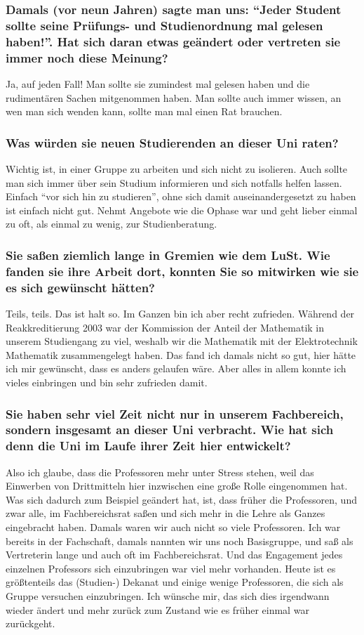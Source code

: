 {    \subsubsection*{Damals (vor neun Jahren) sagte man uns: "`Jeder Student sollte seine Prüfungs- und Studienordnung mal gelesen haben!"'. Hat sich daran etwas geändert oder vertreten sie immer noch diese Meinung?}
    Ja, auf jeden Fall! Man sollte sie zumindest mal gelesen haben und die rudimentären Sachen mitgenommen haben. Man sollte auch immer wissen, an wen man sich wenden kann, sollte man mal einen Rat brauchen.
    \subsubsection*{Was würden sie neuen Studierenden an dieser Uni raten?}
    Wichtig ist, in einer Gruppe zu arbeiten und sich nicht zu isolieren. Auch sollte man sich immer über sein Studium informieren und sich notfalls helfen lassen. Einfach "`vor sich hin zu studieren"', ohne sich damit auseinandergesetzt zu haben ist einfach nicht gut. Nehmt Angebote wie die Ophase war und geht lieber einmal zu oft, als einmal zu wenig, zur Studienberatung.
    \subsubsection*{Sie saßen ziemlich lange in Gremien wie dem LuSt. Wie fanden sie ihre Arbeit dort, konnten Sie so mitwirken wie sie es sich gewünscht hätten?}
    Teils, teils. Das ist halt so. Im Ganzen bin ich aber recht zufrieden. Während der Reakkreditierung 2003 war der Kommission der Anteil der Mathematik in unserem Studiengang zu viel, weshalb wir die Mathematik  mit der Elektrotechnik Mathematik zusammengelegt haben. Das fand ich damals nicht so gut, hier hätte ich mir gewünscht, dass es anders gelaufen wäre. Aber alles in allem konnte ich vieles einbringen und bin sehr zufrieden damit.
    \subsubsection*{Sie haben sehr viel Zeit nicht nur in unserem Fachbereich, sondern insgesamt an dieser Uni verbracht. Wie hat sich denn die Uni im Laufe ihrer Zeit hier entwickelt?}
    Also ich glaube, dass die Professoren mehr unter Stress stehen, weil das Einwerben von Drittmitteln hier inzwischen eine große Rolle eingenommen hat. Was sich dadurch zum Beispiel geändert hat, ist, dass früher die Professoren, und zwar alle, im Fachbereichsrat saßen und sich mehr in die Lehre als Ganzes eingebracht haben. Damals waren wir auch nicht so viele Professoren. Ich war bereits in der Fachschaft, damals nannten wir uns noch Basisgruppe, und saß als Vertreterin lange und auch oft im Fachbereichsrat. Und das Engagement jedes einzelnen Professors sich einzubringen war viel mehr vorhanden. Heute ist es größtenteils das (Studien-) Dekanat und einige wenige Professoren, die sich als Gruppe versuchen einzubringen. Ich wünsche mir, das sich dies irgendwann wieder ändert und mehr zurück zum Zustand wie es früher einmal war zurückgeht.
}

